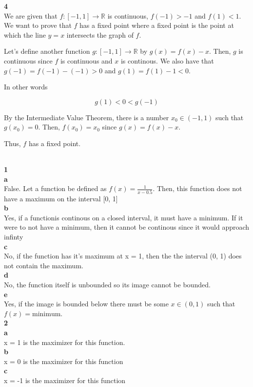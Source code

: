 \documentclass[addpoints]{exam}
\begin{document}
\begin{questions}
\question \textbf{4} \\
We are given that $f: [-1, 1] \rightarrow \mathbb{R}$ is 
continuous, $f(-1) > -1$ and $f(1) < 1$. We want to prove that
$f$ has a fixed point where a fixed point is the point at which the
line $y = x$ intersects the graph of $f$.

Let's define another function $g: [-1, 1] \rightarrow \mathbb{R}$ by
$g(x) = f(x) - x$. Then, $g$ is continuous since $f$ is continuous and
$x$ is continous. We also have that $g(-1) = f(-1) - (-1) > 0$ and
$g(1) = f(1) - 1 < 0$. 

In other words

\[g(1) < 0 < g(-1)\]

By the Intermediate Value Theorem, there is a number $x_0 \in (-1, 1)$
such that $g(x_0) = 0$. Then, $f(x_0) = x_0$ since $g(x) = f(x) - x$.

Thus, $f$ has a fixed point.

\question \\
\textbf{1} \\
\textbf{a}\\
False. Let a function be defined as $f(x) = \frac{1}{x - 0.5}$. Then, this function does not have a maximum on the interval [0, 1]\\ 
\textbf{b}\\
Yes, if a functionis continous on a closed interval, it must have a minimum. If it were to not have a minimum, then it cannot be continous since
it would approach infinty\\
\textbf{c}\\
No, if the function has it's maximum at x = 1, then the the interval (0, 1) does not contain the maximum. \\
\textbf{d}\\
No, the function itself is unbounded so its image cannot be bounded. \\
\textbf{e}\\
Yes, if the image is bounded below there must be some $x \in (0, 1)$ such that $f(x) = \text{minimum}$. \\

\textbf{2} \\
\textbf{a}\\
x = 1 is the maximizer for this function. \\
\textbf{b}\\
x = 0 is the maximizer for this function \\
\textbf{c}\\
x = -1 is the maximizer for this function\\


\end{questions}
\end{document}

